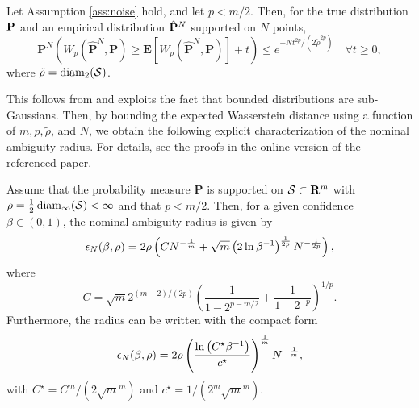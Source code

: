 \begin{proposition}\label{prop:empirical}
Let Assumption \ref{ass:noise} hold, and let $p < m/2$. Then, for the true distribution ${\mathbf P}$ and an empirical distribution $\hat{{\mathbf P}}^N$ supported on $N$ points,
$$\mathbf{P}^N\left(W_p\left(\hat{\mathbf{P}}^N, \mathbf{P}\right) \geq \mathbf{E}\left[W_p\left(\hat{\mathbf{P}}^N, \mathbf{P}\right)\right]+t\right) \leq e^{-N t^{2 p} /\left(2 \tilde{\rho}^{2 p}\right)} \quad \forall t \geq 0,$$
where $\tilde{\rho} = \mathrm{diam}_2(\mathcal{S})$.
\end{proposition}
This follows from \cite[Proposition A.2]{boissard2014mean} and exploits the fact that bounded distributions are sub-Gaussians. 
Then, by bounding the expected Wasserstein distance using a function of $m,p,\tilde{\rho}$, and $N$,  we obtain the following explicit characterization of the nominal ambiguity radius. For details, see the proofs in the online version of the referenced paper. 

\begin{theorem}\label{explicit}
 Assume that the probability measure $\mathbf{P}$ is supported on $\mathcal{S} \subset \mathbf{R}^m$ with $\rho=\frac{1}{2} \operatorname{diam}_{\infty}(\mathcal{S})<\infty$ and that $p<m / 2$. Then, for a given confidence $\beta \in (0,1)$, the nominal ambiguity radius is given by
$$
\epsilon_N(\beta, \rho)=2 \rho\left(C N^{-\frac{1}{m}}+\sqrt{m}\left(2 \ln \beta^{-1}\right)^{\frac{1}{2 p}} N^{-\frac{1}{2 p}}\right),
$$
where 
$$C=\sqrt{m} 2^{(m-2) /(2 p)}\left(\frac{1}{1-2^{p-m / 2}}+\frac{1}{1-2^{-p}}\right)^{1 / p} .$$
Furthermore, the radius can be written with the compact form 
$$
\epsilon_N(\beta, \rho)=2 \rho\left(\frac{\ln \left(C^{\star} \beta^{-1}\right)}{c^{\star}}\right)^{\frac{1}{m}} N^{-\frac{1}{m}},
$$
with $C^{\star}=C^m/(2 \sqrt{m}^m)$ and $c^{\star}=1/(2^m \sqrt{m}^m)$.
\end{theorem}


